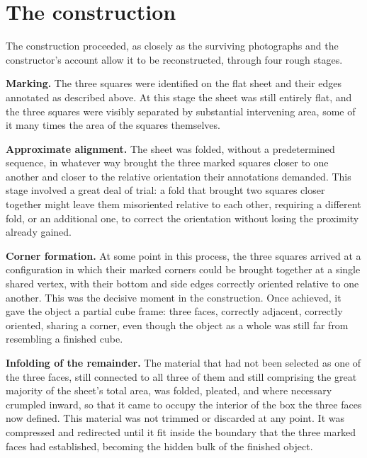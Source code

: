 \documentclass[11pt,oneside]{book}
\begin{document}
\hypertarget{the-construction}{%
\section{The construction}\label{the-construction}}

The construction proceeded, as closely as the surviving photographs and
the constructor's account allow it to be reconstructed, through four
rough stages.

\textbf{Marking.} The three squares were identified on the flat sheet
and their edges annotated as described above. At this stage the sheet
was still entirely flat, and the three squares were visibly separated by
substantial intervening area, some of it many times the area of the
squares themselves.

\textbf{Approximate alignment.} The sheet was folded, without a
predetermined sequence, in whatever way brought the three marked squares
closer to one another and closer to the relative orientation their
annotations demanded. This stage involved a great deal of trial: a fold
that brought two squares closer together might leave them misoriented
relative to each other, requiring a different fold, or an additional
one, to correct the orientation without losing the proximity already
gained.

\textbf{Corner formation.} At some point in this process, the three
squares arrived at a configuration in which their marked corners could
be brought together at a single shared vertex, with their bottom and
side edges correctly oriented relative to one another. This was the
decisive moment in the construction. Once achieved, it gave the object a
partial cube frame: three faces, correctly adjacent, correctly oriented,
sharing a corner, even though the object as a whole was still far from
resembling a finished cube.

\textbf{Infolding of the remainder.} The material that had not been
selected as one of the three faces, still connected to all three of them
and still comprising the great majority of the sheet's total area, was
folded, pleated, and where necessary crumpled inward, so that it came to
occupy the interior of the box the three faces now defined. This
material was not trimmed or discarded at any point. It was compressed
and redirected until it fit inside the boundary that the three marked
faces had established, becoming the hidden bulk of the finished object.
\end{document}
